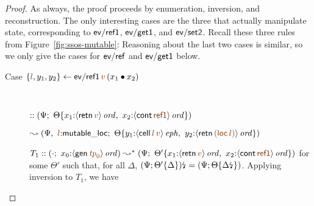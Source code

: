 \begin{proof}
As always, the proof proceeds by enumeration, inversion, and reconstruction. 
The only interesting cases are the three that actually manipulate state,
corresponding to ${\sf ev/ref1}$, ${\sf ev/get1}$, and ${\sf ev/set2}$.
Recall these three rules from Figure~\ref{fig:ssos-mutable}:
\smallskip
{}
\smallskip
%
Reasoning about the last two cases is similar, so we only give the
cases for ${\sf ev/ref}$ and ${\sf ev/get1}$ below.

\begin{description}
\item
  [Case $\trstep{\lf{l}, y_1, y_2}
         {{\sf ev/ref1}\,\lf{v}\,(\tfuser{x_1}{x_2})}$]~

\qquad 
  $:: \left(\Psi; ~ 
   \tackon{\Theta}{x_1{:}\istrue{\susp{{\sf retn}\,\lf{v}}}, ~
                   x_2{:}\istrue{\susp{{\sf cont}\,\lf{\sf ref1}}}}
   \right)$

\qquad\qquad
  $\leadsto \left(\Psi, ~ \lf{l}{:}{\sf mutable\_loc}; ~
   \tackon{\Theta}{y_1{:}\iseph{\susp{{\sf cell}\,\lf{l}\,\lf{v}}}, ~
                   y_2{:}\istrue{\susp{{\sf retn}\,\lf{({\sf loc}\,\lf{l})}}}}
   \right)$

   \medskip 
   $T_1 :: (\cdot; ~ x_0{:}\istrue{\susp{{\sf gen}\,\lf{{\it tp}_0}}}) 
    \leadsto^* \left(\Psi; ~
     \tackon{\Theta'}{x_1{:}\istrue{\susp{{\sf retn}\,\lf{v}}}, ~
                   x_2{:}\istrue{\susp{{\sf cont}\,\lf{\sf ref1}}}}
     \right)$ for some $\Theta'$ such that, for all $\Delta$,
   ${(\Psi; {\Theta'}\{{\Delta}\})}{\mbox{\lightning}}_{} = (\Psi;
   {\Theta}\{{{\Delta}{\mbox{\lightning}}_{}}\})$. Applying 
   inversion to $T_1$, we have

   \medskip


\end{description}
\end{proof}
